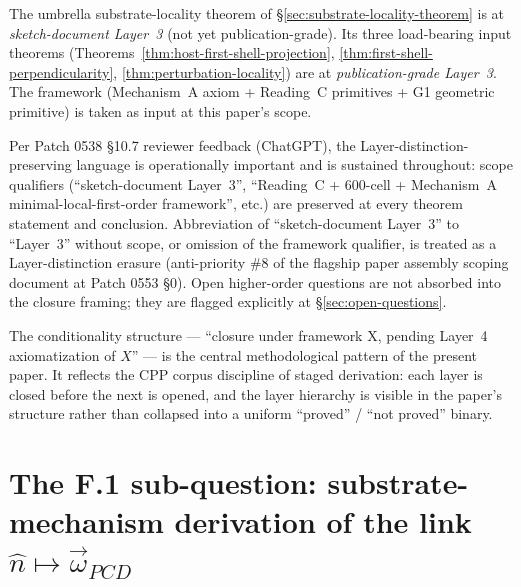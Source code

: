 \documentclass[11pt,letterpaper]{article}
\newcommand{\omegaPCD}{\vec{\omega}_{PCD}}
\begin{document}
The umbrella substrate-locality theorem of \S\ref{sec:substrate-locality-theorem} is at \emph{sketch-document Layer~3} (not yet publication-grade). Its three load-bearing input theorems (Theorems~\ref{thm:host-first-shell-projection}, \ref{thm:first-shell-perpendicularity}, \ref{thm:perturbation-locality}) are at \emph{publication-grade Layer~3}. The framework (Mechanism~A axiom + Reading~C primitives + G1 geometric primitive) is taken as input at this paper's scope.

Per Patch 0538 \S10.7 reviewer feedback (ChatGPT), the Layer-distinction-preserving language is operationally important and is sustained throughout: scope qualifiers (``sketch-document Layer~3'', ``Reading~C + 600-cell + Mechanism~A minimal-local-first-order framework'', etc.) are preserved at every theorem statement and conclusion. Abbreviation of ``sketch-document Layer~3'' to ``Layer~3'' without scope, or omission of the framework qualifier, is treated as a Layer-distinction erasure (anti-priority \#8 of the flagship paper assembly scoping document at Patch 0553 \S0). Open higher-order questions are not absorbed into the closure framing; they are flagged explicitly at \S\ref{sec:open-questions}.

The conditionality structure --- ``closure under framework X, pending Layer~4 axiomatization of $X$'' --- is the central methodological pattern of the present paper. It reflects the CPP corpus discipline of staged derivation: each layer is closed before the next is opened, and the layer hierarchy is visible in the paper's structure rather than collapsed into a uniform ``proved'' / ``not proved'' binary.

\section{The F.1 sub-question: substrate-mechanism derivation of the link
$\hat{n} \mapsto \omegaPCD$}
\label{sec:subquestion}

\end{document}
